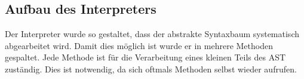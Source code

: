 
\subsection{Aufbau des Interpreters}
Der Interpreter wurde so gestaltet, dass der abstrakte Syntaxbaum systematisch abgearbeitet wird. Damit dies möglich ist wurde er in mehrere Methoden gespaltet. Jede Methode ist für die Verarbeitung eines kleinen Teils des AST zuständig. Dies ist notwendig, da sich oftmals Methoden selbst wieder aufrufen.

